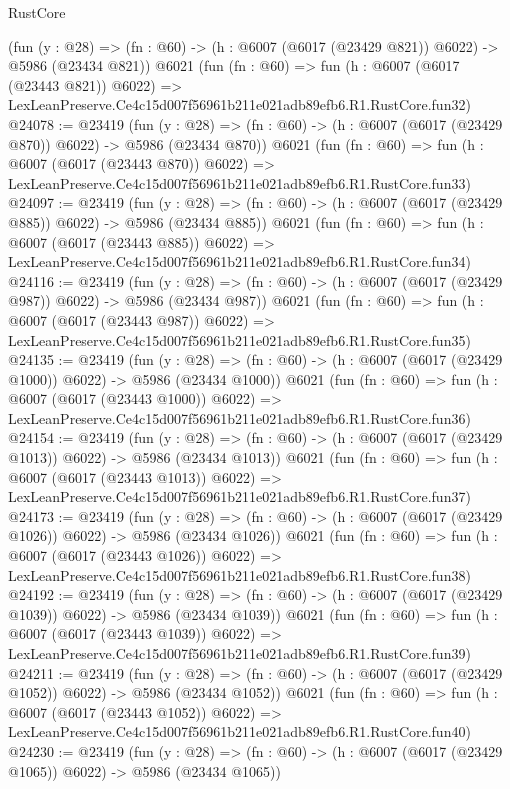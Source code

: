 \begin{lexlean}{RustCore}
\begin{coremodule}
    (fun (y : @28) => (fn : @60) -> (h : @6007 (@6017 (@23429 @821)) @6022) -> @5986 (@23434 @821))
    @6021
    (fun (fn : @60) =>
    fun (h : @6007 (@6017 (@23443 @821)) @6022) =>
    LexLeanPreserve.Ce4c15d007f56961b211e021adb89efb6.R1.RustCore.fun32)
@24078 := @23419
    (fun (y : @28) => (fn : @60) -> (h : @6007 (@6017 (@23429 @870)) @6022) -> @5986 (@23434 @870))
    @6021
    (fun (fn : @60) =>
    fun (h : @6007 (@6017 (@23443 @870)) @6022) =>
    LexLeanPreserve.Ce4c15d007f56961b211e021adb89efb6.R1.RustCore.fun33)
@24097 := @23419
    (fun (y : @28) => (fn : @60) -> (h : @6007 (@6017 (@23429 @885)) @6022) -> @5986 (@23434 @885))
    @6021
    (fun (fn : @60) =>
    fun (h : @6007 (@6017 (@23443 @885)) @6022) =>
    LexLeanPreserve.Ce4c15d007f56961b211e021adb89efb6.R1.RustCore.fun34)
@24116 := @23419
    (fun (y : @28) => (fn : @60) -> (h : @6007 (@6017 (@23429 @987)) @6022) -> @5986 (@23434 @987))
    @6021
    (fun (fn : @60) =>
    fun (h : @6007 (@6017 (@23443 @987)) @6022) =>
    LexLeanPreserve.Ce4c15d007f56961b211e021adb89efb6.R1.RustCore.fun35)
@24135 := @23419
    (fun (y : @28) =>
    (fn : @60) -> (h : @6007 (@6017 (@23429 @1000)) @6022) -> @5986 (@23434 @1000))
    @6021
    (fun (fn : @60) =>
    fun (h : @6007 (@6017 (@23443 @1000)) @6022) =>
    LexLeanPreserve.Ce4c15d007f56961b211e021adb89efb6.R1.RustCore.fun36)
@24154 := @23419
    (fun (y : @28) =>
    (fn : @60) -> (h : @6007 (@6017 (@23429 @1013)) @6022) -> @5986 (@23434 @1013))
    @6021
    (fun (fn : @60) =>
    fun (h : @6007 (@6017 (@23443 @1013)) @6022) =>
    LexLeanPreserve.Ce4c15d007f56961b211e021adb89efb6.R1.RustCore.fun37)
@24173 := @23419
    (fun (y : @28) =>
    (fn : @60) -> (h : @6007 (@6017 (@23429 @1026)) @6022) -> @5986 (@23434 @1026))
    @6021
    (fun (fn : @60) =>
    fun (h : @6007 (@6017 (@23443 @1026)) @6022) =>
    LexLeanPreserve.Ce4c15d007f56961b211e021adb89efb6.R1.RustCore.fun38)
@24192 := @23419
    (fun (y : @28) =>
    (fn : @60) -> (h : @6007 (@6017 (@23429 @1039)) @6022) -> @5986 (@23434 @1039))
    @6021
    (fun (fn : @60) =>
    fun (h : @6007 (@6017 (@23443 @1039)) @6022) =>
    LexLeanPreserve.Ce4c15d007f56961b211e021adb89efb6.R1.RustCore.fun39)
@24211 := @23419
    (fun (y : @28) =>
    (fn : @60) -> (h : @6007 (@6017 (@23429 @1052)) @6022) -> @5986 (@23434 @1052))
    @6021
    (fun (fn : @60) =>
    fun (h : @6007 (@6017 (@23443 @1052)) @6022) =>
    LexLeanPreserve.Ce4c15d007f56961b211e021adb89efb6.R1.RustCore.fun40)
@24230 := @23419
    (fun (y : @28) =>
    (fn : @60) -> (h : @6007 (@6017 (@23429 @1065)) @6022) -> @5986 (@23434 @1065))

\end{coremodule}
\end{lexlean}
